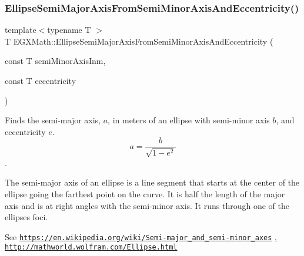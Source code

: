 \mbox{\label{group___e_g_x_math-_geometry-2_d-_ellipse-_semi_major_axis_ga505f404b0c1f4f73853c97e0a9ee2ef1}} 
\subsubsection{\texorpdfstring{Ellipse\+Semi\+Major\+Axis\+From\+Semi\+Minor\+Axis\+And\+Eccentricity()}{EllipseSemiMajorAxisFromSemiMinorAxisAndEccentricity()}}
{\footnotesize\ttfamily template$<$typename T $>$ \\
T E\+G\+X\+Math\+::\+Ellipse\+Semi\+Major\+Axis\+From\+Semi\+Minor\+Axis\+And\+Eccentricity (\begin{DoxyParamCaption}\item[{const T}]{semi\+Minor\+Axis\+Inm,  }\item[{const T}]{eccentricity }\end{DoxyParamCaption})}



Finds the semi-\/major axis, $a$, in meters of an ellipse with semi-\/minor axis $b$, and eccentricity $e$. \[ a=\frac{b}{\sqrt{1-e^2}} \]. 

The semi-\/major axis of an ellipse is a line segment that starts at the center of the ellipse going the farthest point on the curve. It is half the length of the major axis and is at right angles with the semi-\/minor axis. It runs through one of the ellipses foci.

See \href{https://en.wikipedia.org/wiki/Semi-major_and_semi-minor_axes}{\tt https\+://en.\+wikipedia.\+org/wiki/\+Semi-\/major\+\_\+and\+\_\+semi-\/minor\+\_\+axes} , \href{http://mathworld.wolfram.com/Ellipse.html}{\tt http\+://mathworld.\+wolfram.\+com/\+Ellipse.\+html}


